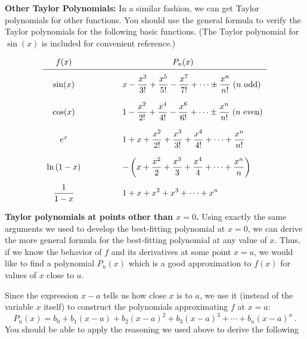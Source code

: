 {{{{\medskip



{\bf Other Taylor Polynomials:}  
In a similar fashion, we can get Taylor polynomials for other functions.  You should use the general formula to verify the Taylor polynomials for the following basic functions.  (The Taylor polynomial for $\sin(x)$ is included for convenient reference.)


\mbox{}
\vspace{-20pt}
\[
\begin{array}{ccl}
        f(x)  &\rule{30pt}{0pt}& \rule{60pt}{0pt} P_n(x) \\ [2pt] \hline
        & \\ [-6pt]
        \sin(x) & &{\displaystyle x - {x^3 \over 3!} + {x^5 \over 5!}
                - {x^7 \over 7!} + \cdots \pm {x^n \over n!}} \;
        (n \mbox{ odd})\\ [.2in]
        \cos(x) & &{\displaystyle 1 - {x^2 \over 2!} + {x^4 \over 4!} 
                - {x^6 \over 6!} + \cdots \pm {x^n \over n!}} \;
                (n \mbox{ even})\\ [.2in]
        e^x & &{\displaystyle 1 + x + {x^2 \over 2!} + {x^3 \over 3!} 
                + {x^4 \over 4!} + \cdots + {x^n \over n!}} \\ [.2in]
        \ln{(1-x)} & &{\displaystyle  -\left(x+{x^2 \over 2} + {x^3 \over 3} 
                + {x^4 \over 4} + \cdots + {x^n \over n}\right) }\\ [.2in]
        {\displaystyle {1 \over {1-x}} }& &{\displaystyle 1+x+x^2+x^3+\cdots +x^n}
        \end{array}
\]

\medskip



{\bf Taylor polynomials at points other than $x=0$.}  
Using exactly the same arguments we used to develop the best-fitting polynomial at $x=0$, we can derive the more general formula for the best-fitting polynomial at any value of $x$.  Thus, if we know the behavior of $f$ and its derivatives at some point $x=a$, we would like to find a polynomial $P_n(x)$ which is a good approximation to $f(x)$ for values of $x$ close to $a$.  

Since the expression $x-a$ tells us how close $x$ is to $a$, we use it (instead of the variable $x$ itself) to construct the polynomials approximating $f$ at $x=a$:
\[
P_n(x)=b_0+b_1(x-a)+b_2(x-a)^2+b_3(x-a)^3+\cdots+b_n(x-a)^n \, .
\]
You should be able to apply the reasoning we used above to derive the following

}}}}
